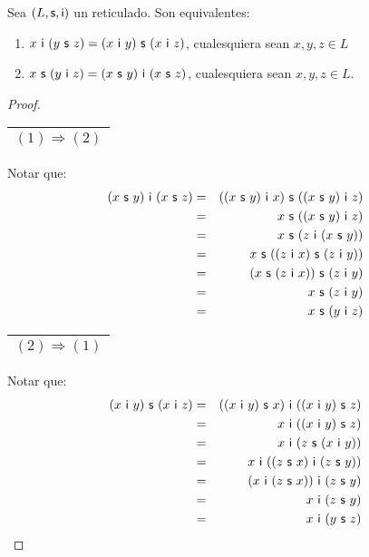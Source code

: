   \begin{lemma} \label{lemma_20}
    \PN Sea $(L, \mathsf{s}, \mathsf{i})$ un reticulado. Son equivalentes:
    \begin{enumerate}[(1)]
      \item $x \ \IN \ (y \ \SU \ z) = (x \ \IN \ y) \ \SU \ (x \ \IN \ z)$, cualesquiera sean $x, y, z \in L$
      \item $x \ \SU \ (y \ \IN \ z) = (x \ \SU \ y) \ \IN \ (x \ \SU \ z)$, cualesquiera sean $x, y, z \in L$.
    \end{enumerate}
  \end{lemma}
  \begin{proof}
    \PN \begin{tabular}{|c|} \hline $(1) \Rightarrow (2)$ \\\hline \end{tabular} Notar que:
    \begin{eqnarray*}
      (x \ \SU \ y) \ \IN \ (x \ \SU \ z) &=& ((x \ \SU \ y) \ \IN \ x) \ \SU \ ((x \ \SU \ y) \ \IN \ z) \\
      &=& x \ \SU \ ((x \ \SU \ y) \ \IN \ z) \\
      &=& x \ \SU \ (z \ \IN \ (x \ \SU \ y)) \\
      &=& x \ \SU \ ((z \ \IN \ x) \ \SU \ (z \ \IN \ y)) \\
      &=& (x \ \SU \ (z \ \IN \ x)) \ \SU \ (z \ \IN \ y) \\
      &=& x \ \SU \ (z \ \IN \ y) \\
      &=& x \ \SU \ (y \ \IN \ z)
    \end{eqnarray*}

    \PN \begin{tabular}{|c|} \hline $(2) \Rightarrow (1)$ \\\hline \end{tabular} Notar que:
    \begin{eqnarray*}
      (x \ \IN \ y) \ \SU \ (x \ \IN \ z) &=& ((x \ \IN \ y) \ \SU \ x) \ \IN \ ((x \ \IN \ y) \ \SU \ z) \\
      &=& x \ \IN \ ((x \ \IN \ y) \ \SU \ z) \\
      &=& x \ \IN \ (z \ \SU \ (x \ \IN \ y)) \\
      &=& x \ \IN \ ((z \ \SU \ x) \ \IN \ (z \ \SU \ y)) \\
      &=& (x \ \IN \ (z \ \SU \ x)) \ \IN \ (z \ \SU \ y) \\
      &=& x \ \IN \ (z \ \SU \ y) \\
      &=& x \ \IN \ (y \ \SU \ z)
    \end{eqnarray*}
  \end{proof}

